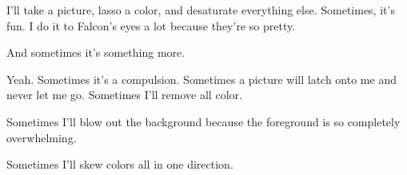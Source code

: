 

\begin{paracol}{2}
  \begin{leftcolumn}
I'll take a picture, lasso a color, and desaturate everything else. Sometimes, it's fun. I do it to Falcon's eyes a lot because they're so pretty.

\begin{ally}
And sometimes it's something more.
\end{ally}
Yeah. Sometimes it's a compulsion. Sometimes a picture will latch onto me and never let me go. Sometimes I'll remove all color.
\end{leftcolumn}
\end{paracol}






\begin{paracol}{2}
  \begin{leftcolumn}
Sometimes I'll blow out the background because the foreground is so completely overwhelming.
\end{leftcolumn}
\end{paracol}



\null
\vfill
Sometimes I'll skew colors all in one direction.
\vfill



\vfill
\newpage

